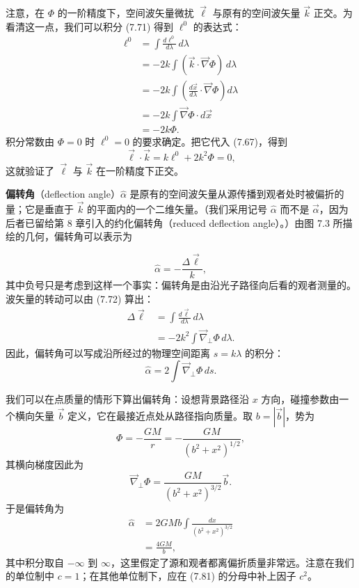 注意，在 $\Phi$ 的一阶精度下，空间波矢量微扰 $\vec{\ell}$ 与原有的空间波矢量 $\vec{k}$ 正交。为看清这一点，我们可以积分 (7.71) 得到 $\ell^0$ 的表达式：
\begin{align*}
\ell^0 &= \int \frac{d\ell^0}{d\lambda}\, d\lambda \\
&= -2k\int (\vec{k}\cdot\vec{\nabla}\Phi)\, d\lambda \\
&= -2k\int \left(\frac{d\vec{x}}{d\lambda}\cdot\vec{\nabla}\Phi\right) d\lambda \\
&= -2k\int \vec{\nabla}\Phi\cdot d\vec{x} \\
&= -2k\Phi.
\tag{7.74}
\end{align*}
积分常数由 $\Phi = 0$ 时 $\ell^0 = 0$ 的要求确定。把它代入 (7.67)，得到
\begin{equation*}
\vec{\ell}\cdot\vec{k} = k\ell^0 + 2k^2\Phi = 0,
\tag{7.75}
\end{equation*}
这就验证了 $\vec{\ell}$ 与 $\vec{k}$ 在一阶精度下正交。

\textbf{偏转角}（deflection angle）$\widehat{\alpha}$ 是原有的空间波矢量从源传播到观者处时被偏折的量；它是垂直于 $\vec{k}$ 的平面内的一个二维矢量。（我们采用记号 $\widehat{\alpha}$ 而不是 $\vec{\alpha}$，因为后者已留给第 8 章引入的约化偏转角（reduced deflection angle）。）由图 7.3 所描绘的几何，偏转角可以表示为


\begin{equation*}
\widehat{\alpha} = -\frac{\Delta\vec{\ell}}{k},
\tag{7.76}
\end{equation*}
其中负号只是考虑到这样一个事实：偏转角是由沿光子路径向后看的观者测量的。波矢量的转动可以由 (7.72) 算出：
\begin{align*}
\Delta\vec{\ell} &= \int\frac{d\vec{\ell}}{d\lambda}\, d\lambda \\
&= -2k^2\int \vec{\nabla}_{\perp}\Phi\, d\lambda.
\tag{7.77}
\end{align*}
因此，偏转角可以写成沿所经过的物理空间距离 $s = k\lambda$ 的积分：
\begin{equation*}
\boxed{\,\widehat{\alpha} = 2\int \vec{\nabla}_{\perp}\Phi\, ds.\,}
\tag{7.78}
\end{equation*}

我们可以在点质量的情形下算出偏转角：设想背景路径沿 $x$ 方向，碰撞参数由一个横向矢量 $\vec{b}$ 定义，它在最接近点处从路径指向质量。取 $b = |\vec{b}|$，势为
\begin{equation*}
\Phi = -\frac{GM}{r} = -\frac{GM}{(b^2+x^2)^{1/2}},
\tag{7.79}
\end{equation*}
其横向梯度因此为
\begin{equation*}
\vec{\nabla}_{\perp}\Phi = \frac{GM}{(b^2+x^2)^{3/2}}\vec{b}.
\tag{7.80}
\end{equation*}
于是偏转角为
\begin{align*}
\widehat{\alpha} &= 2GMb\int \frac{dx}{(b^2+x^2)^{3/2}} \\
&= \frac{4GM}{b},
\tag{7.81}
\end{align*}
其中积分取自 $-\infty$ 到 $\infty$，这里假定了源和观者都离偏折质量非常远。注意在我们的单位制中 $c = 1$；在其他单位制下，应在 (7.81) 的分母中补上因子 $c^2$。

